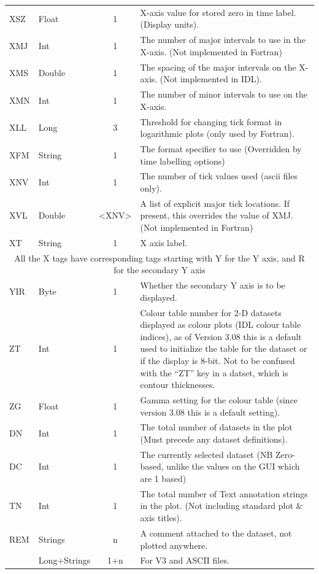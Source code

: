 \documentclass[english]{article}
\begin{document}
\begin{longtable}{|llcp{9cm}|}
  XSZ& Float& 1&
  X-axis value for stored zero in time label. (Display units).\\
  XMJ & Int & 1 & The number of major intervals to use in the
  X-axis. (Not implemented in Fortran)\\
  XMS & Double & 1 & The spacing of the major intervals on the
  X-axis. (Not implemented in IDL).\\
  XMN & Int & 1 & The number of minor intervals to use on the X-axis.\\
  XLL & Long & 3 & Threshold for changing tick format in logarithmic
  plots (only used by Fortran).\\
  XFM & String & 1 & The format specifier to use (Overridden by time
  labelling options) \\
  XNV & Int & 1 & The number of tick values used (ascii files only).\\
  XVL & Double & <XNV> & A list of explicit major tick locations. If
  present, this overrides the value of XMJ. (Not implemented in Fortran)\\
  XT& String& 1&
  X axis label.\\
  \hline \multicolumn{4}{|c|}{All the X tags have corresponding tags
    starting
    with Y for the Y axis, and R for the secondary Y axis}\\
  \hline
  YIR & Byte & 1 & Whether the secondary Y axis is to be displayed.\\
  \hline
  ZT& Int& 1& Colour table number for 2-D datasets displayed as
  colour plots (IDL colour table indices), as of Version 3.08 this is a
  default used to initialize the table for the dataset or if the
  display is 8-bit. Not to be confused with the ``ZT'' key in a datset,
  which is contour thicknesses.\\
  ZG& Float& 1& Gamma setting for the colour table (since version 3.08
  this is a
  default setting).\\
  DN& Int& 1& The total number of datasets in the plot (Must precede
  any dataset
  definitions).\\
  DC& Int& 1& The currently selected dataset (NB Zero-based, unlike the
  values on
  the GUI which are 1 based)\\
  TN& Int& 1& The total number of Text annotation strings in the
  plot. (Not including
  standard plot \& axis titles).\\
  REM& Strings& n&
  A comment attached to the dataset, not plotted anywhere.\\
  & Long+Strings& 1+n&
  For V3 and ASCII files.\\

\end{longtable}
\end{document}
